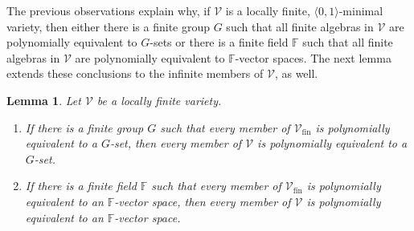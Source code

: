 \documentclass[12pt]{amsart}
\newtheorem{lm}[thm]{Lemma}
\theoremstyle{definition}
\numberwithin{equation}{section}
\begin{document}
The previous observations explain why, if $\mathcal{V}$
is a locally finite, $\langle 0,1\rangle$-minimal variety,
then either there is a finite group $G$ such that
all finite algebras in $\mathcal{V}$ are polynomially equivalent
to $G$-sets or there is a finite field $\mathbb{F}$
such that
all finite algebras in $\mathcal{V}$ are polynomially equivalent
to $\mathbb{F}$-vector spaces. The next lemma extends
these conclusions to the infinite members
of $\mathcal{V}$, as well.

\begin{lm} \label{infinite}
Let $\mathcal{V}$ be a locally finite variety.  
\begin{enumerate}
\item If there is a finite group $G$ such that
  every member of $\mathcal{V}_{\textrm{fin}}$ is polynomially
  equivalent to a $G$-set, then every member of $\mathcal{V}$
is polynomially
  equivalent to a $G$-set. 
\item If there is a finite field $\mathbb{F}$ such that
  every member of $\mathcal{V}_{\textrm{fin}}$ is polynomially
  equivalent to an $\mathbb{F}$-vector space,
  then every member of $\mathcal{V}$
is polynomially
  equivalent to an $\mathbb{F}$-vector space.
\end{enumerate}
\end{lm}
\end{document}
